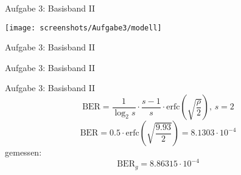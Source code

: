 \begin{frame}{Aufgabe 3: Basisband II}
  \begin{center}
  \texttt{[image: screenshots/Aufgabe3/modell]}
  \end{center}
\end{frame}

\begin{frame}{Aufgabe 3: Basisband II}
\end{frame}

\begin{frame}{Aufgabe 3: Basisband II}
\end{frame}

\begin{frame}{Aufgabe 3: Basisband II}
  \[\mathrm{BER} = \frac{1}{\log_2{s}} \cdot \frac{s-1}{s} \cdot
    \mathrm{erfc}{\left(\sqrt{\frac{\rho}{2}}\right)}, \, s = 2\]
  \[\mathrm{BER} = 0.5 \cdot \mathrm{erfc}{\left( \sqrt{\frac{9.93}{2}}
      \right)} = 8.1303 \cdot 10^{-4}\]
  gemessen:
  \[\mathrm{BER}_g = 8.86315 \cdot 10^{-4}\]
\end{frame}